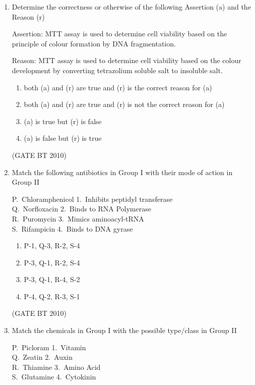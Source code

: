 \documentclass[journal,12pt,onecolumn]{IEEEtran}
\theoremstyle{remark}
\begin{document}
\begin{enumerate}
\item Determine the correctness or otherwise of the following Assertion (a) and the Reason (r)  

Assertion: MTT assay is used to determine cell viability based on the principle of colour formation by DNA fragmentation.  

Reason: MTT assay is used to determine cell viability based on the colour development by converting tetrazolium soluble salt to insoluble salt.  

\begin{enumerate}
   \item both (a) and (r) are true and (r) is the correct reason for (a)  
   \item both (a) and (r) are true and (r) is not the correct reason for (a)  
   \item (a) is true but (r) is false  
   \item (a) is false but (r) is true  
\end{enumerate}
\hfill (GATE BT 2010)

\item Match the following antibiotics in Group I with their mode of action in Group II  

P.\ Chloramphenicol \hspace{2cm} 1.\ Inhibits peptidyl transferase \\  
Q.\ Norfloxacin \hspace{2.9cm} 2.\ Binds to RNA Polymerase \\  
R.\ Puromycin \hspace{3.1cm} 3.\ Mimics aminoacyl-tRNA \\  
S.\ Rifampicin \hspace{3.3cm} 4.\ Binds to DNA gyrase \\  

\begin{enumerate}
\item P-1, Q-3, R-2, S-4  
\item P-3, Q-1, R-2, S-4  
\item P-3, Q-1, R-4, S-2  
\item P-4, Q-2, R-3, S-1  
\end{enumerate}
\hfill (GATE BT 2010)


\item Match the chemicals in Group I with the possible type/class in Group II  

P.\ Picloram \hspace{2.9cm} 1.\ Vitamin \\  
Q.\ Zeatin \hspace{3.5cm} 2.\ Auxin \\  
R.\ Thiamine \hspace{3cm} 3.\ Amino Acid \\  
S.\ Glutamine \hspace{2.6cm} 4.\ Cytokinin \\  


\end{enumerate}
\end{document}
